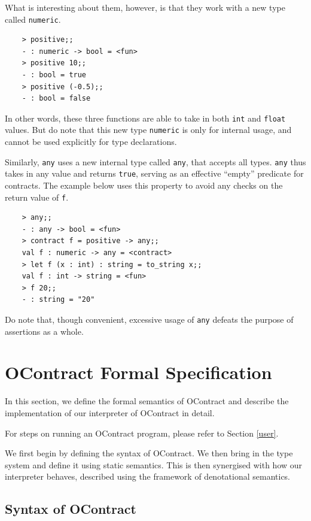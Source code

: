 \documentclass[a4paper]{article}
\begin{document}
What is interesting about them, however, is that they work with a new type called \texttt{numeric}.

\begin{verbatim}
    > positive;;
    - : numeric -> bool = <fun>
    > positive 10;;
    - : bool = true
    > positive (-0.5);;
    - : bool = false
\end{verbatim}

In other words, these three functions are able to take in both \texttt{int} and \texttt{float} values.
But do note that this new type \texttt{numeric} is only for internal usage, and cannot be used explicitly for type declarations.

Similarly, \texttt{any} uses a new internal type called \texttt{any}, that accepts all types.
\texttt{any} thus takes in any value and returns \texttt{true}, serving as an effective ``empty'' predicate for contracts.
The example below uses this property to avoid any checks on the return value of \texttt{f}.

\begin{verbatim}
    > any;;
    - : any -> bool = <fun>
    > contract f = positive -> any;;
    val f : numeric -> any = <contract>
    > let f (x : int) : string = to_string x;;
    val f : int -> string = <fun>
    > f 20;;
    - : string = "20"
\end{verbatim}

Do note that, though convenient, excessive usage of \texttt{any} defeats the purpose of assertions as a whole.

\section{OContract Formal Specification}
\label{developer}

In this section, we define the formal semantics of OContract and describe the implementation of our interpreter of OContract in detail.

For steps on running an OContract program, please refer to Section \ref{user}.

We first begin by defining the syntax of OContract.
We then bring in the type system and define it using static semantics.
This is then synergised with how our interpreter behaves, described using the framework of denotational semantics.

\subsection{Syntax of OContract}
\end{document}
